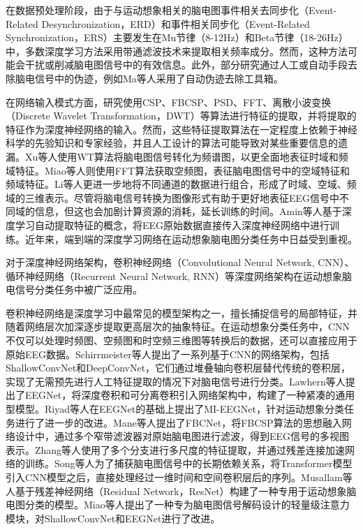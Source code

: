 在数据预处理阶段，由于与运动想象相关的脑电图事件相关去同步化（Event-Related Desynchronization，ERD）和事件相关同步化（Event-Related Synchronization，ERS）主要发生在Mu节律（8-12Hz）和Beta节律（18-26Hz）中\cite{altaheri2023deep}，多数深度学习方法采用带通滤波技术来提取相关频率成分。然而，这种方法可能会干扰或削减脑电图信号中的有效信息。此外，部分研究通过人工或自动手段去除脑电信号中的伪迹，例如Ma等人\cite{ma2019deep}采用了自动伪迹去除工具箱\cite{gomez2006automatic}。

在网络输入模式方面，研究\cite{luo2018exploring,olivas2019classification,she2019hierarchical,ma2020dwt,chu2018decoding,hassanpour2019novel}使用CSP、FBCSP、PSD、FFT、离散小波变换（Discrete Wavelet Transformation，DWT）等算法进行特征的提取，并将提取的特征作为深度神经网络的输入。然而，这些特征提取算法在一定程度上依赖于神经科学的先验知识和专家经验，并且人工设计的算法可能导致对某些重要信息的遗漏。Xu等人\cite{xu2018wavelet}使用WT算法将脑电图信号转化为频谱图，以更全面地表征时域和频域特征。Miao等人\cite{miao2020spatial}则使用FFT算法获取空频图，表征脑电图信号中的空域特征和频域特征。Li等人\cite{li2020novel}更进一步地将不同通道的数据进行组合，形成了时域、空域、频域的三维表示。尽管将脑电信号转换为图像形式有助于更好地表征EEG信号中不同域的信息，但这也会加剧计算资源的消耗，延长训练的时间。Amin\cite{amin2019deep}等人基于深度学习自动提取特征的概念，将EEG原始数据直接传入深度神经网络中进行训练。近年来，端到端的深度学习网络在运动想象脑电图分类任务中日益受到重视。

对于深度神经网络架构，卷积神经网络（Convolutional Neural Network, CNN）、循环神经网络（Recurrent Neural Network, RNN）等深度网络架构在运动想象脑电信号分类任务中被广泛应用。

卷积神经网络是深度学习中最常见的模型架构之一，擅长捕捉信号的局部特征，并随着网络层次加深逐步提取更高层次的抽象特征。在运动想象分类任务中，CNN不仅可以处理时频图、空频图和时空频三维图等转换后的数据，还可以直接应用于原始EEG数据。Schirrmeister等人\cite{schirrmeister2017deep}提出了一系列基于CNN的网络架构，包括ShallowConvNet和DeepConvNet，它们通过堆叠轴向卷积层替代传统的卷积层，实现了无需预先进行人工特征提取的情况下对脑电信号进行分类。Lawhern等人\cite{lawhern2018eegnet}提出了EEGNet，将深度卷积和可分离卷积引入网络架构中，构建了一种紧凑的通用型模型。Riyad等人\cite{riyad2021mi}在EEGNet的基础上提出了MI-EEGNet，针对运动想象分类任务进行了进一步的改进。Mane等人\cite{mane2021fbcnet}提出了FBCNet，将FBCSP算法的思想融入网络设计中，通过多个窄带滤波器对原始脑电图进行滤波，得到EEG信号的多视图表示。Zhang等人\cite{zhang2021eeg}使用了多个分支进行多尺度的特征提取，并通过残差连接加速网络的训练。Song等人\cite{song2022eeg}为了捕获脑电图信号中的长期依赖关系，将Transformer\cite{vaswani2017attention}模型引入CNN模型之后，直接处理经过一维时间和空间卷积层后的序列。Musallam等人\cite{musallam2021electroencephalography}基于残差神经网络（Residual Network，ResNet）\cite{he2016deep}构建了一种专用于运动想象脑电图分类的模型。Miao等人\cite{miao2023lmda}提出了一种专为脑电图信号解码设计的轻量级注意力模块，对ShallowConvNet和EEGNet进行了改进。

